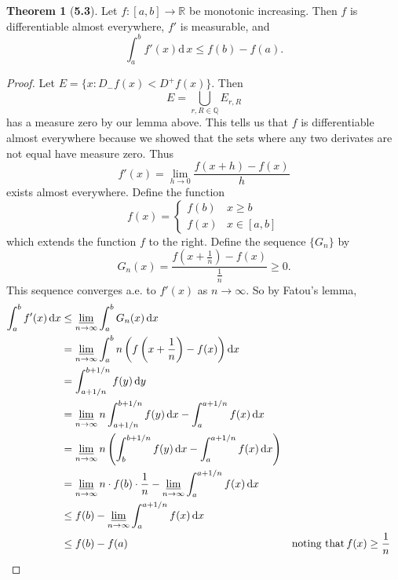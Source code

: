 \documentclass[12pt]{article}
\newcommand{\R}{\mathbb{R}}
\newcommand{\Q}{\mathbb{Q}}
\theoremstyle{definition}
\newtheorem*{thm}{Theorem}
\begin{document}
\begin{thm}[\textbf{5.3}]

    Let \( f: [a,b] \to \R \) be monotonic increasing. Then \( f \) is differentiable almost everywhere, \( f' \)
    is measurable, and 
        \[
            \int_{a}^{b} f'(x) \mathrm{d}\,x \leq f(b) - f(a).  
        \]

        \begin{proof}
            Let \( E = \{ x: D_{-}f(x) < D^{+} f(x)\} \). Then 
                \[
                    E = \bigcup_{r, R \in \Q} E_{r, R}  
                \]
            has a measure zero by our lemma above. This tells us that \( f \) is differentiable almost everywhere because
            we showed that the sets where any two derivates are not equal have measure zero. Thus
                \[
                    f'(x) = \lim_{h \to 0} \frac{f(x+h) - f(x)}{h}  
                \] 
            exists almost everywhere. Define the function
                \[
                    f(x) = \begin{cases}
                        f(b) & x \geq b \\
                        f(x) & x \in [a,b]
                    \end{cases}  
                \]
            which extends the function \( f \) to the right. Define the sequence \( \{ G_n\} \) by 
                    \[
                        G_n(x) = \frac{f\left( x + \frac{1}{n} \right) - f(x)}{\frac{1}{n}} \geq 0.
                    \]
            This sequence converges a.e. to \( f'(x) \) as \( n \to \infty \). So by Fatou's lemma,
                    \begin{align*}
                        \int_{a}^{b} f'(x) \, \mathrm{d}x & \leq \varliminf_{n \to \infty} \int_{a}^{b} G_n(x) \, \mathrm{d} x \\
                        &= \varliminf_{n \to \infty} \int_{a}^{b} n \left( f \left( x + \frac{1}{n}\right) - f(x) \right) \mathrm{d} x \\
                        &= \int_{a + 1/n}^{b + 1/n} f(y) \, \mathrm{d} y \\
                        &= \varliminf_{n \to \infty} n \int_{a + 1/n}^{b + 1/n} f(y) \, \mathrm{d} x - \int_{a}^{a + 1/n} f(x) \, \mathrm{d}x \\
                        &= \varliminf_{n \to \infty} n \left(\int_{b}^{b + 1/n} f(y) \, \mathrm{d} x - \int_{a}^{a + 1/n} f(x) \, \mathrm{d}x \right) \\
                        &= \varliminf_{n \to \infty} n \cdot f(b) \cdot \frac{1}{n} - \varliminf_{n \to \infty} \int_{a}^{a + 1/n} f(x) \, \mathrm{d}x \\ 
                        &\leq f(b) -  \varliminf_{n \to \infty} \int_{a}^{a + 1/n} f(x) \, \mathrm{d}x \\
                        &\leq f(b) - f(a) && \text{noting that} \, f(x) \geq \frac{1}{n}
                    \end{align*}
                

\end{proof}
\end{thm}
\end{document}
